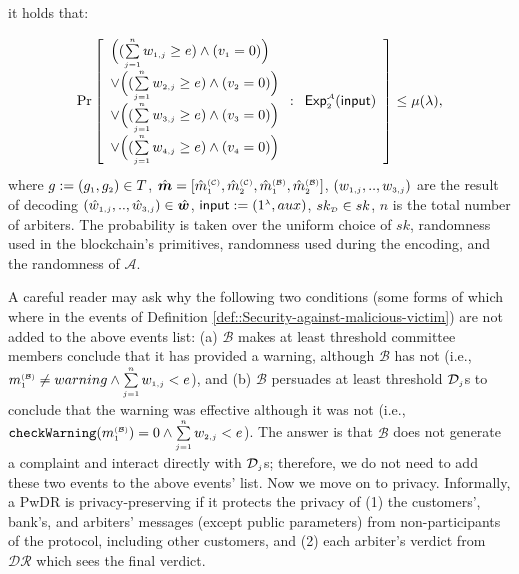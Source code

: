 \begin{definition}
it holds that:

$$ \Pr\left[
  \begin{array}{l}
  
 
\Big( (\sum\limits_{\st j=1}^{\st n}w_{\st 1,j}\geq e) \wedge ( v_{\st 1}=0)\Big) \\
 
 \vee \Big(( \sum\limits_{\st j=1}^{\st n}w_{\st 2,j}\geq e) \wedge ( v_{\st 2}=0)\Big) \\
 \vee  \Big(( \sum\limits_{\st j=1}^{\st n}w_{\st 3,j}\geq e) \wedge ( v_{\st 3}=0)\Big) \\
  \vee  \Big(( \sum\limits_{\st j=1}^{\st n}w_{\st 4,j}\geq e) \wedge ( v_{\st 4}=0)\Big) \\
\end{array} :
    \begin{array}{l}
    \mathsf{Exp}_{\st 2}^{\st\mathcal{A}}(\mathsf{input})\\
\end{array}    \right]\leq \mu(\lambda),$$
where $g:=(g_{\st 1}, g_{\st 2})\in T$, $\hat {\bm m}=[\hat {m}^{\st (\mathcal{C})}_{\st 1}, \hat {m}^{\st (\mathcal{C})}_{\st 2}, \hat {m}^{\st (\mathcal{B})}_{\st 1}, \hat {m}^{\st (\mathcal{B})}_{\st 2}]$, $(w_{\st 1,j},..,w_{\st 3,j})$ are the result of decoding   $(\hat w_{\st 1,j},..,\hat w_{\st 3,j})\in \hat {\bm w}$, $\mathsf{input}:=(1^{\st\lambda},  {aux})$, $ sk_{\st \mathcal{D}}\in sk$, $n$ is the total number of arbiters. The probability is taken over the uniform choice of $sk$, randomness used in the blockchain's primitives, randomness used during the encoding, and  the randomness of $\mathcal{A}$. 
\end{definition}


A careful reader may ask why the following two conditions (some forms of which where in the events of Definition \ref{def::Security-against-malicious-victim}) are not added to the above events list: (a) $\mathcal{B}$ makes at least threshold committee members conclude that it  has provided a warning, although $\mathcal{B}$ has not (i.e., $ m^{\scriptscriptstyle\mathcal{(B)}}_{\scriptscriptstyle1}\neq warning \wedge \sum\limits_{\scriptscriptstyle j=1}^{\scriptscriptstyle n}w_{\scriptscriptstyle 1,j}<  e$), and (b) $\mathcal{B}$ persuades at least threshold $\mathcal{D}_{\scriptscriptstyle j}$s  to conclude that the warning was effective although it was not (i.e., $\mathtt{checkWarning}(m^{\scriptscriptstyle\mathcal{(B)}}_{\scriptscriptstyle1})= 0 \wedge \sum\limits_{\scriptscriptstyle j=1}^{\scriptscriptstyle n}w_{\scriptscriptstyle 2,j}< e$). The answer is that  $\mathcal{B}$ does not generate a complaint  and interact directly with $\mathcal{D}_{\scriptscriptstyle j}$s; therefore, we do not need to add these two events to the above events' list. Now we move on to privacy. Informally, a PwDR is privacy-preserving if it protects the privacy of (1) the customers', bank's, and arbiters' messages (except public parameters) from  non-participants of the protocol, including other customers, and (2) each   arbiter's verdict from $\mathcal{DR}$  which sees the final verdict. 





